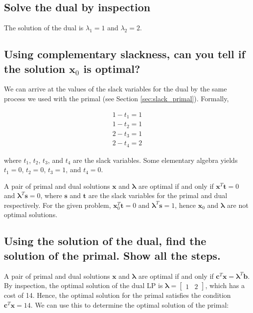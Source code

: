 \documentclass{article}
\begin{document}
\subsection{Solve the dual by inspection}

The solution of the dual is $\lambda_1 = 1$ and $\lambda_2 = 2$.

\subsection{Using complementary slackness, can you tell if the solution $\mathbf{x}_0$ is optimal?} \label{sec:compl_slack}

We can arrive at the values of the slack variables for the dual by the same process we used with the primal (see Section \ref{sec:slack_primal}). Formally,

\begin{align*}
1 - t_1 = 1\\
1 - t_2 = 1\\
2 - t_3 = 1\\
2 - t_4 = 2
\end{align*}

\noindent where $t_1$, $t_2$, $t_3$, and $t_4$ are the slack variables. Some elementary algebra yields $t_1 = 0$, $t_2 = 0$, $t_3 = 1$, and $t_4 = 0$.

A pair of primal and dual solutions $\mathbf{x}$ and $\boldsymbol{\lambda}$ are optimal if and only if $\mathbf{x}^T \mathbf{t} = 0$ and $\boldsymbol{\lambda}^T \mathbf{s} = 0$, where $\mathbf{s}$ and $\mathbf{t}$ are the slack variables for the primal and dual respectively.
For the given problem, $\mathbf{x}_0^T \mathbf{t} = 0$ and $\boldsymbol{\lambda}^T \mathbf{s} = 1$, hence $\mathbf{x}_0$ and $\boldsymbol{\lambda}$ are not optimal solutions.

\subsection{Using the solution of the dual, find the solution of the primal. Show all the steps.}

A pair of primal and dual solutions $\mathbf{x}$ and $\boldsymbol{\lambda}$ are optimal if and only if $\mathbf{c}^T \mathbf{x} = \boldsymbol{\lambda}^T \mathbf{b}$.
By inspection, the optimal solution of the dual LP is $\boldsymbol{\lambda} = \begin{bmatrix}1 & 2\end{bmatrix}$, which has a cost of 14.
Hence, the optimal solution for the primal satisfies the condition $\mathbf{c}^T \mathbf{x} = 14$.
We can use this to determine the optimal solution of the primal:
\end{document}
